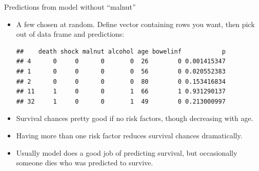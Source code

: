 \begin{frame}[fragile]{Predictions from model without ``malnut''}
  
  \begin{itemize}
  \item A few chosen at random. Define vector containing rows you
    want, then pick out of data frame and predictions:

    {\small
\begin{knitrout}
\color{fgcolor}\begin{kframe}
\begin{alltt}
\hlkwb{=}\hlstd{=}\hlstd{)}
\hlkwb{=}\hlstd{(}\hlstd{,}\hlstd{,}\hlstd{,}\hlstd{,}\hlstd{)}
\end{alltt}
\begin{verbatim}
##    death shock malnut alcohol age bowelinf           p
## 4      0     0      0       0  26        0 0.001415347
## 1      0     0      0       0  56        0 0.020552383
## 2      0     0      0       0  80        0 0.153416834
## 11     1     0      0       1  66        1 0.931290137
## 32     1     0      0       1  49        0 0.213000997
\end{verbatim}
\end{kframe}
\end{knitrout}
}

\item Survival chances pretty good if no risk factors, though decreasing with age.
\item Having more than one risk factor reduces survival chances dramatically.
\item Usually model does a good job of predicting survival, but occasionally someone dies who was predicted to survive.
  \end{itemize}
  
\end{frame}

